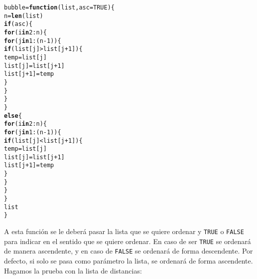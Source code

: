\documentclass[12pt]{report}\usepackage[]{graphicx}\usepackage[dvipsnames]{xcolor}
\makeatletter
\newcommand{\hlnum}[1]{\textcolor[rgb]{0.686,0.059,0.569}{#1}}%
\newcommand{\hlopt}[1]{\textcolor[rgb]{0,0,0}{#1}}%
\newcommand{\hlstd}[1]{\textcolor[rgb]{0.345,0.345,0.345}{#1}}%
\newcommand{\hlkwa}[1]{\textcolor[rgb]{0.161,0.373,0.58}{\textbf{#1}}}%
\newcommand{\hlkwb}[1]{\textcolor[rgb]{0.69,0.353,0.396}{#1}}%
\newcommand{\hlkwc}[1]{\textcolor[rgb]{0.333,0.667,0.333}{#1}}%
\newcommand{\hlkwd}[1]{\textcolor[rgb]{0.737,0.353,0.396}{\textbf{#1}}}%
\newenvironment{kframe}{%
 \def\at@end@of@kframe{}%
 \ifinner\ifhmode%
  \def\at@end@of@kframe{\end{minipage}}%
  \begin{minipage}{\columnwidth}%
 \fi\fi%
 \def\FrameCommand##1{\hskip\@totalleftmargin \hskip-\fboxsep
 \colorbox{shadecolor}{##1}\hskip-\fboxsep
     \hskip-\linewidth \hskip-\@totalleftmargin \hskip\columnwidth}%
 \MakeFramed {\advance\hsize-\width
   \@totalleftmargin\z@ \linewidth\hsize
   \@setminipage}}%
 {\par\unskip\endMakeFramed%
 \at@end@of@kframe}
\newenvironment{knitrout}{}{} %
\makeatother
\begin{document}
\begin{knitrout}
\color{fgcolor}\begin{kframe}
\begin{alltt}
\hlstd{bubble} \hlkwb{=} \hlkwa{function}\hlstd{(}\hlkwc{list}\hlstd{,} \hlkwc{asc} \hlstd{=} \hlnum{TRUE}\hlstd{)\{}
        \hlstd{n} \hlkwb{=} \hlkwd{len}\hlstd{(list)}
        \hlkwa{if}\hlstd{(asc)\{}
                \hlkwa{for} \hlstd{(i} \hlkwa{in} \hlnum{2}\hlopt{:}\hlstd{n)\{}
                        \hlkwa{for} \hlstd{(j} \hlkwa{in} \hlnum{1}\hlopt{:}\hlstd{(n}\hlopt{-}\hlnum{1}\hlstd{))\{}
                                \hlkwa{if} \hlstd{(list[j]} \hlopt{>} \hlstd{list[j}\hlopt{+}\hlnum{1}\hlstd{])\{}
                                        \hlstd{temp} \hlkwb{=} \hlstd{list[j]}
                                        \hlstd{list[j]} \hlkwb{=} \hlstd{list[j}\hlopt{+}\hlnum{1}\hlstd{]}
                                        \hlstd{list[j}\hlopt{+}\hlnum{1}\hlstd{]} \hlkwb{=} \hlstd{temp}
                                \hlstd{\}}
                        \hlstd{\}}
                \hlstd{\}}
        \hlstd{\}}
        \hlkwa{else} \hlstd{\{}
                \hlkwa{for} \hlstd{(i} \hlkwa{in} \hlnum{2}\hlopt{:}\hlstd{n)\{}
                        \hlkwa{for} \hlstd{(j} \hlkwa{in} \hlnum{1}\hlopt{:}\hlstd{(n}\hlopt{-}\hlnum{1}\hlstd{))\{}
                                \hlkwa{if} \hlstd{(list[j]} \hlopt{<} \hlstd{list[j}\hlopt{+}\hlnum{1}\hlstd{])\{}
                                        \hlstd{temp} \hlkwb{=} \hlstd{list[j]}
                                        \hlstd{list[j]} \hlkwb{=} \hlstd{list[j}\hlopt{+}\hlnum{1}\hlstd{]}
                                        \hlstd{list[j}\hlopt{+}\hlnum{1}\hlstd{]} \hlkwb{=} \hlstd{temp}
                                \hlstd{\}}
                        \hlstd{\}}
                \hlstd{\}}
        \hlstd{\}}
        \hlstd{list}
\hlstd{\}}
\end{alltt}
\end{kframe}
\end{knitrout}
			
			A esta función se le deberá pasar la lista que se quiere ordenar y \texttt{TRUE} o \texttt{FALSE} para indicar en el sentido que se quiere ordenar. En caso de ser \texttt{TRUE} se ordenará de manera ascendente, y en caso de \texttt{FALSE} se ordenará de forma descendente. Por defecto, si solo se pasa como parámetro la lista, se ordenará de forma ascendente. Hagamos la prueba con la lista de distancias:
			
\end{document}
